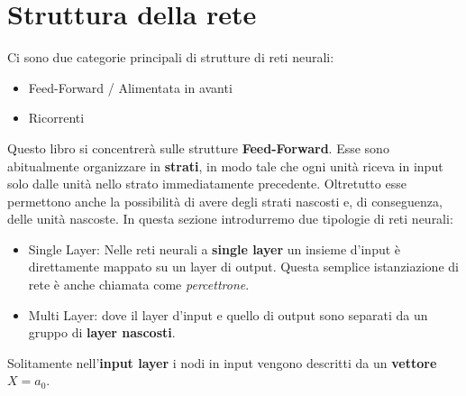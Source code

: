 \section{Struttura della rete}
Ci sono due categorie principali di strutture di reti neurali:
\begin{itemize}
	\item Feed-Forward / Alimentata in avanti
	\item Ricorrenti
\end{itemize}
Questo libro si concentrerà sulle strutture \textbf{Feed-Forward}. Esse sono abitualmente organizzare in \textbf{strati}, in modo tale che ogni unità riceva in input solo dalle unità nello strato immediatamente precedente. Oltretutto esse permettono anche la possibilità di avere degli strati nascosti e, di conseguenza, delle unità nascoste. In questa sezione introdurremo due tipologie di reti neurali:
\begin{itemize}
	\item Single Layer: 
	      Nelle reti neurali a \textbf{single layer} un insieme d'input è direttamente mappato su un layer di output. Questa semplice istanziazione di rete è anche chiamata come \textit{percettrone}.
	\item Multi Layer: dove il layer d'input e quello di output sono separati da un gruppo di \textbf{layer nascosti}. 
\end{itemize}
Solitamente nell'\textbf{input layer} i nodi in input vengono descritti da un \textbf{vettore} $X = a_0$.
